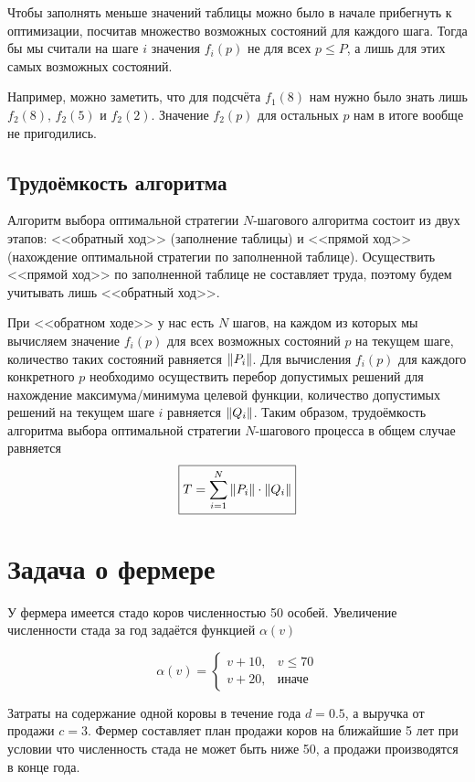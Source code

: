 \remark

Чтобы заполнять меньше значений таблицы можно было в начале прибегнуть к оптимизации, посчитав множество возможных состояний для каждого шага. Тогда бы мы считали на шаге $i$ значения $f_i(p)$ не для всех $p \le P$, а лишь для этих самых возможных состояний.

Например, можно заметить, что для подсчёта $f_1(8)$ нам нужно было знать лишь $f_2(8)$, $f_2(5)$ и $f_2(2)$. Значение $f_2(p)$ для остальных $p$ нам в итоге вообще не пригодились.

\subsection{Трудоёмкость алгоритма}\label{n_step_complexity}

Алгоритм выбора оптимальной стратегии $N$-шагового алгоритма состоит из двух этапов: <<обратный ход>> (заполнение таблицы) и <<прямой ход>> (нахождение оптимальной стратегии по заполненной таблице). Осуществить <<прямой ход>> по заполненной таблице не составляет труда, поэтому будем учитывать лишь <<обратный ход>>.

При <<обратном ходе>> у нас есть $N$ шагов, на каждом из которых мы вычисляем значение $f_i(p)$ для всех возможных состояний $p$ на текущем шаге, количество таких состояний равняется $\norm{P_i}$. Для вычисления $f_i(p)$ для каждого конкретного $p$ необходимо осуществить перебор допустимых решений для нахождение максимума/минимума целевой функции, количество допустимых решений на текущем шаге $i$ равняется $\norm{Q_i}$. Таким образом, трудоёмкость алгоритма выбора оптимальной стратегии $N$-шагового процесса в общем случае равняется
\[
\boxed{T = \sum_{i=1}^{N} \norm{P_i} \cdot \norm{Q_i}}
\]

\section{Задача о фермере}

\problem[о фермере]

У фермера имеется стадо коров численностью 50 особей. Увеличение численности стада за год задаётся функцией $\alpha(v)$

\[
\alpha(v) = \begin{cases}
	v + 10,& v \le 70 \\
	v + 20,& \text{иначе}
\end{cases}
\]

Затраты на содержание одной коровы в течение года $d = 0.5$, а выручка от продажи $c = 3$. Фермер составляет план продажи коров на ближайшие 5 лет при условии что численность стада не может быть ниже 50, а продажи производятся в конце года.

